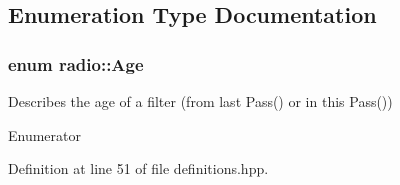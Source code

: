 \subsection{Enumeration Type Documentation}
\hypertarget{namespaceradio_a90839d95c13fa21f45e9cd380e38f1f3}{
\subsubsection[{Age}]{\setlength{\rightskip}{0pt plus 5cm}enum {\bf radio\+::\+Age}}}\label{namespaceradio_a90839d95c13fa21f45e9cd380e38f1f3}
Describes the age of a filter (from last Pass() or in this Pass()) \begin{Desc}
\item[Enumerator]\par
\begin{description}
\item[{\em 
\hypertarget{namespaceradio_a90839d95c13fa21f45e9cd380e38f1f3afbe8ecd067dc1095175b7cdc7cecbb82}{O\+L\+D}\label{namespaceradio_a90839d95c13fa21f45e9cd380e38f1f3afbe8ecd067dc1095175b7cdc7cecbb82}
}]\item[{\em 
\hypertarget{namespaceradio_a90839d95c13fa21f45e9cd380e38f1f3ac1a7d3b0b6d1c9639e94bdd8c8692686}{N\+E\+W}\label{namespaceradio_a90839d95c13fa21f45e9cd380e38f1f3ac1a7d3b0b6d1c9639e94bdd8c8692686}
}]\end{description}
\end{Desc}


Definition at line 51 of file definitions.\+hpp.

